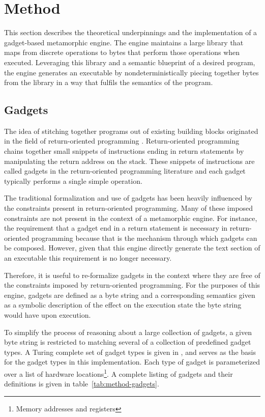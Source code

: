 \chapter{Method}

    This section describes the theoretical underpinnings and the implementation
    of a gadget-based metamorphic engine. The engine maintains a large library
    that maps from discrete operations to bytes that perform those operations
    when executed. Leveraging this library and a semantic blueprint of a desired
    program, the engine generates an executable by nondeterministically piecing
    together bytes from the library in a way that fulfils the semantics of the
    program.

    \section{Gadgets}
    
    The idea of stitching together programs out of existing building blocks
    originated in the field of return-oriented programming \cite{rop_geo}.
    Return-oriented programming chains together small snippets of instructions
    ending in return statements by manipulating the return address on the stack.
    These snippets of instructions are called gadgets in the return-oriented
    programming literature and each gadget typically performs a single simple
    operation.

    The traditional formalization and use of gadgets has been heavily influenced
    by the constraints present in return-oriented programming. Many of these
    imposed constraints are not present in the context of a metamorphic engine.
    For instance, the requirement that a gadget end in a return statement is
    necessary in return-oriented programming because that is the mechanism
    through which gadgets can be composed. However, given that this engine
    directly generate the text section of an executable this requirement is no
    longer necessary.

    Therefore, it is useful to re-formalize gadgets in the context where they
    are free of the constraints imposed by return-oriented programming. For the
    purposes of this engine, gadgets are defined as a byte string and a
    corresponding semantics given as a symbolic description of the effect on the
    execution state the byte string would have upon execution.

    To simplify the process of reasoning about a large collection of gadgets, a
    given byte string is restricted to matching several of a collection of
    predefined gadget types. A Turing complete set of gadget types is given in
    \cite{franken}, and serves as the basis for the gadget types in this
    implementation. Each type of gadget is parameterized over a list of hardware
    locations\footnote{Memory addresses and registers}. A complete listing of
    gadgets and their definitions is given in table~\ref{tab:method-gadgets}.

